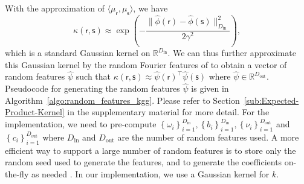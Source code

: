 \documentclass[english]{article}
\theoremstyle{plain}
\theoremstyle{plain}
\newcommand{\secref}[1]{Section~\ref{#1}}
\begin{document}
With the approximation of $\langle \mu_{\mathsf{r}},\mu_{\mathsf{s}}  \rangle$,
we have
\begin{equation}
\kappa(\mathsf{r}, \mathsf{s})\approx\exp\left(-\frac{\|\hat{\phi}(\mathsf{r})-\hat{\phi}(\mathsf{s})\|_{D_\mathrm{in}}^{2}}{2\gamma^{2}}\right),
%
\end{equation}
which is a standard Gaussian kernel on $\mathbb{R}^{D_\mathrm{in}}$.
We can thus further approximate this Gaussian kernel 
%
%
by the random Fourier features of \citeauthor{Rahimi2007} to obtain a vector 
of random features $\hat{\psi}$ such that 
$\kappa(\mathsf{r}, \mathsf{s}) \approx \hat{\psi}(\mathsf{r})^\top \hat{\psi}(\mathsf{s})$
where $\hat{\psi} \in \mathbb{R}^{D_\mathrm{out}}$. 
Pseudocode for generating the random features $\hat{\psi}$ is given in Algorithm~\ref{algo:random_features_kgg}. 
Please refer to \secref{sub:Expected-Product-Kernel} in the supplementary material for more detail.
For the implementation, we need to pre-compute $\left\{ \omega_{i}\right\} _{i=1}^{D_\mathrm{in}},\left\{ b_{i}\right\} _{i=1}^{D_\mathrm{in}},\left\{ \nu_{i}\right\} _{i=1}^{D_\mathrm{out}}$
and $\left\{ c_{i}\right\} _{i=1}^{D_\mathrm{out}}$ where $D_\mathrm{in}$ and
$D_\mathrm{out}$ are the number of random features used. 
A more efficient way to support a large number of random features 
is to store only the random seed used to generate 
the features, and to generate the coefficients  on-the-fly as needed \citep{Dai2014}. 
In our implementation, we use a Gaussian kernel for $k$.

\end{document}
